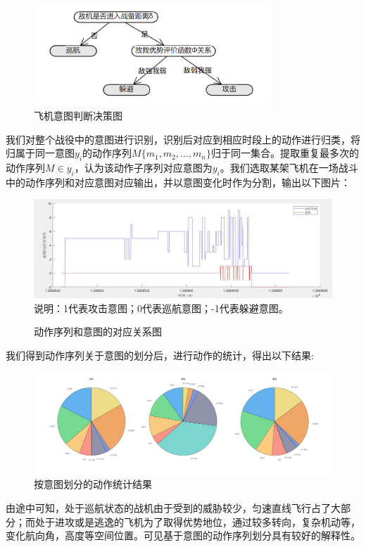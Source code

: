 \documentclass{my_paper}
\begin{document}
\begin {figure}[h]
\centering %
\includegraphics[width=0.8\textwidth]{yitu.png}
\caption{飞机意图判断决策图} %
\label{pdjc}
\end {figure}


我们对整个战役中的意图进行识别，识别后对应到相应时段上的动作进行归类，将归属于同一意图$y_i$的动作序列$M\{m_1,m_2,...,m_n\}$归于同一集合。提取重复最多次的动作序列$M\in y_i$，认为该动作子序列对应意图为$y_i$。我们选取某架飞机在一场战斗中的动作序列和对应意图对应输出，并以意图变化时作为分割，输出以下图片：

\begin {figure}[h]
\centering %
\includegraphics[width=\textwidth]{9.jpg}
说明：1代表攻击意图；0代表巡航意图；-1代表躲避意图。
\caption{动作序列和意图的对应关系图} %
\label{five}
\end {figure}

\newpage
我们得到动作序列关于意图的划分后，进行动作的统计，得出以下结果:
\begin {figure}[h]
\centering %
\includegraphics[width=\textwidth]{jieguo.jpg}
\caption{按意图划分的动作统计结果} %
\label{five}
\end {figure}
由途中可知，处于巡航状态的战机由于受到的威胁较少，匀速直线飞行占了大部分；而处于进攻或是逃逸的飞机为了取得优势地位，通过较多转向，复杂机动等，变化航向角，高度等空间位置。可见基于意图的动作序列划分具有较好的解释性。
\end{document}

